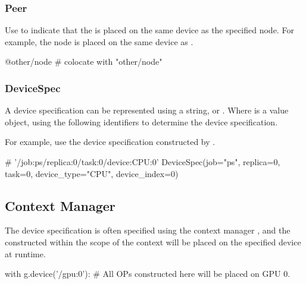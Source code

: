 \begin{content}
\subsubsection{Peer}
Use  to indicate that the  is placed on the same device as the specified node. For example, the node is placed on the same device as .

\begin{leftbar}
\begin{python}
@other/node  # colocate with "other/node"
\end{python}
\end{leftbar}


\subsubsection{DeviceSpec}
A device specification can be represented using a string, or . Where  is a value object, using the following  identifiers to determine the device specification.

\begin{enum}
\end{enum}

For example, use the device specification constructed by .

\begin{leftbar}
\begin{python}
# '/job:ps/replica:0/task:0/device:CPU:0'
DeviceSpec(job="ps", replica=0, task=0, device_type="CPU", device_index=0)
\end{python}
\end{leftbar}


\subsection{Context Manager}
The  device specification is often specified using the context manager , and the  constructed within the scope of the context will be placed on the specified device at runtime.

\begin{leftbar}
\begin{python}
with g.device('/gpu:0'):
  # All OPs constructed here will be placed on GPU 0.
\end{python}
\end{leftbar}


\end{content}
